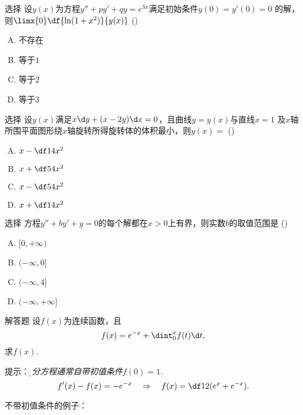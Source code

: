 \begin{frame}{选择}
	\linespread{1.3}
	设$y(x)$为方程$y''+py'+qy=e^{3x}$满足初始条件$y(0)=y'(0)=0$
	的解，则$\limx{0}\df{\ln(1+x^2)}{y(x)}$
	(\underline{\;})
	\begin{enumerate}[(A)]
	  \item 不存在
	  \item 等于$1$
	  \item 等于$2$
	  \item 等于$3$
	\end{enumerate}
\end{frame}

\begin{frame}{选择}
	\linespread{1.3}
	设$y(x)$满足$x\d y+(x-2y)\d x=0$，且曲线$y=y(x)$与直线$x=1$
	及$x$轴所围平面图形绕$x$轴旋转所得旋转体的体积最小，则$y(x)=$
	(\underline{\;})
	\begin{enumerate}[(A)]
	  \item $x-\df14x^2$
	  \item $x+\df54x^2$
	  \item $x-\df54x^2$
	  \item $x+\df14x^2$
	\end{enumerate}
\end{frame}

\begin{frame}{选择}
	\linespread{1.3}
	方程$y''+by'+y=0$的每个解都在$x>0$上有界，则实数$b$的取值范围是
	(\underline{\;})
	\begin{enumerate}[(A)]
	  \item $[0,+\infty)$
	  \item $(-\infty,0]$
	  \item $(-\infty,4]$
	  \item $(-\infty,+\infty]$
	\end{enumerate}
\end{frame}


\begin{frame}{解答题}
	\linespread{1.2}
	设$f(x)$为连续函数，且
	$$f(x)=e^{-x}+\dint_0^xf(t)\d t,$$
	求$f(x)$.
	
	\pause\alert{提示：}\it\b  积分方程通常自带初值条件$f(0)=1$.\pause
	$$f'(x)-f(x)=-e^{-x}\quad\Rightarrow\quad 
	f(x)=\df12(e^x+e^{-x}).$$
	
	\pause 不带初值条件的例子：
\end{frame}

